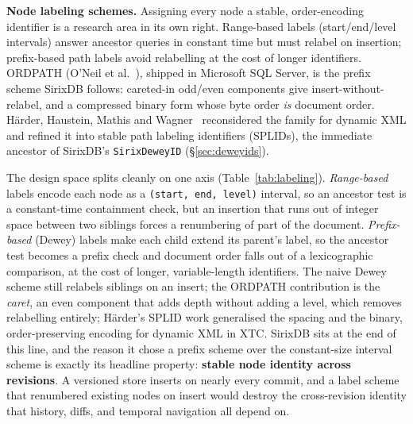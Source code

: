 \documentclass[11pt,a4paper,oneside]{report}
\theoremstyle{sirixthm}
\newcommand{\code}[1]{\texttt{#1}}
\begin{document}
\textbf{Node labeling schemes.} Assigning every node a stable, order-encoding identifier is a research
area in its own right. Range-based labels (start/end/level intervals) answer ancestor queries in
constant time but must relabel on insertion; prefix-based path labels avoid relabelling at the cost of
longer identifiers. ORDPATH (O'Neil et al.~\cite{ordpath}), shipped in Microsoft SQL Server, is the
prefix scheme SirixDB follows: careted-in odd/even components give insert-without-relabel, and a
compressed binary form whose byte order \emph{is} document order. H\"arder, Haustein, Mathis and
Wagner~\cite{haerderlabels} reconsidered the family for dynamic XML and refined it into stable path
labeling identifiers (SPLIDs), the immediate ancestor of SirixDB's \code{SirixDeweyID}
(\S\ref{sec:deweyids}).

The design space splits cleanly on one axis (Table~\ref{tab:labeling}). \emph{Range-based} labels
encode each node as a \code{(start, end, level)} interval, so an ancestor test is a constant-time
containment check, but an insertion that runs out of integer space between two siblings forces a
renumbering of part of the document. \emph{Prefix-based} (Dewey) labels make each child extend its
parent's label, so the ancestor test becomes a prefix check and document order falls out of a
lexicographic comparison, at the cost of longer, variable-length identifiers. The naive Dewey scheme
still relabels siblings on an insert; the ORDPATH contribution is the \emph{caret}, an even component
that adds depth without adding a level, which removes relabelling entirely; H\"arder's SPLID work
generalised the spacing and the binary, order-preserving encoding for dynamic XML in XTC. SirixDB sits
at the end of this line, and the reason it chose a prefix scheme over the constant-size interval scheme
is exactly its headline property: \textbf{stable node identity across revisions}. A versioned store
inserts on nearly every commit, and a label scheme that renumbered existing nodes on insert would
destroy the cross-revision identity that history, diffs, and temporal navigation all depend on.
\end{document}
